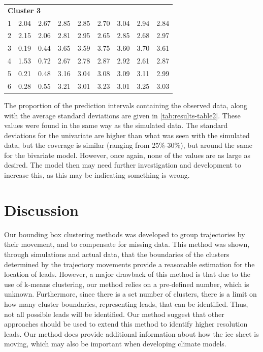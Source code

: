 \documentclass[12pt]{article}
\begin{document}
\begin{table}
\begin{tabular}[t]{rrrrrrrrr}
\multicolumn{9}{l}{\textbf{Cluster 3}}\\
\hspace{1em}1 & 2.04 & 2.67 & 2.85 & 2.85 & 2.70 & 3.04 & 2.94 & 2.84\\
\hspace{1em}2 & 2.15 & 2.06 & 2.81 & 2.95 & 2.65 & 2.85 & 2.68 & 2.97\\
\hspace{1em}3 & 0.19 & 0.44 & 3.65 & 3.59 & 3.75 & 3.60 & 3.70 & 3.61\\
\hspace{1em}4 & 1.53 & 0.72 & 2.67 & 2.78 & 2.87 & 2.92 & 2.61 & 2.87\\
\hspace{1em}5 & 0.21 & 0.48 & 3.16 & 3.04 & 3.08 & 3.09 & 3.11 & 2.99\\
\hspace{1em}6 & 0.28 & 0.55 & 3.21 & 3.01 & 3.23 & 3.01 & 3.25 & 3.03\\
\bottomrule
\end{tabular}
\end{table}

The proportion of the prediction intervals containing the observed data,
along with the average standard deviations are given in
\cref{tab:results-table2}. These values were found in the same way as
the simulated data. The standard deviations for the univariate are
higher than what was seen with the simulated data, but the coverage is
similar (ranging from 25\%-30\%), but around the same for the bivariate
model. However, once again, none of the values are as large as desired.
The model then may need further investigation and development to
increase this, as this may be indicating something is wrong.

\hypertarget{discussion}{%
\section{Discussion}\label{discussion}}

Our bounding box clustering methods was developed to group trajectories
by their movement, and to compensate for missing data. This method was
shown, through simulations and actual data, that the boundaries of the
clusters determined by the trajectory movements provide a reasonable
estimation for the location of leads. However, a major drawback of this
method is that due to the use of k-means clustering, our method relies
on a pre-defined number, which is unknown. Furthermore, since there is a
set number of clusters, there is a limit on how many cluster boundaries,
representing leads, that can be identified. Thus, not all possible leads
will be identified. Our method suggest that other approaches should be
used to extend this method to identify higher resolution leads. Our
method does provide additional information about how the ice sheet is
moving, which may also be important when developing climate models.
\end{document}
